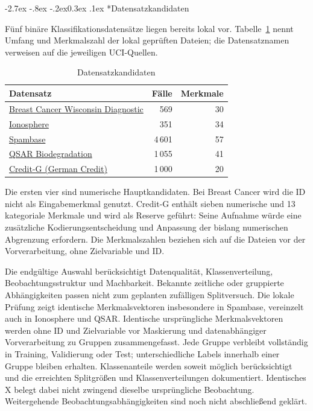 \documentclass[12pt,a4paper]{article}
\makeatletter
\renewcommand\subsection{\@startsection{subsection}{2}{\z@}%
  {-2.7ex \@plus -.8ex \@minus -.2ex}{0.3ex \@plus .1ex}%
  {\normalfont\large\bfseries}}
\makeatother
\begin{document}
\subsection*{Datensatzkandidaten}

Fünf binäre Klassifikationsdatensätze liegen bereits lokal vor.
Tabelle~\ref{tab:datensaetze} nennt Umfang und Merkmalszahl der lokal
geprüften Dateien; die Datensatznamen verweisen auf die jeweiligen
UCI-Quellen.

\begin{table}[htb]
\centering
\small
\caption{Datensatzkandidaten}
\label{tab:datensaetze}
\begin{tabular}{p{6.5cm}rr}
\toprule
\textbf{Datensatz} & \textbf{Fälle} & \textbf{Merkmale}\\
\midrule
\href{https://archive.ics.uci.edu/dataset/17/breast+cancer+wisconsin+diagnostic}{Breast Cancer Wisconsin Diagnostic}
  & 569 & 30\\
\href{https://archive.ics.uci.edu/dataset/52/ionosphere}{Ionosphere}
  & 351 & 34\\
\href{https://archive.ics.uci.edu/dataset/94/spambase}{Spambase}
  & 4\,601 & 57\\
\href{https://archive.ics.uci.edu/dataset/254/qsar+biodegradation}{QSAR Biodegradation}
  & 1\,055 & 41\\
\href{https://archive.ics.uci.edu/dataset/144/statlog+german+credit+data}{Credit-G (German Credit)}
  & 1\,000 & 20\\
\bottomrule
\end{tabular}
\end{table}

Die ersten vier sind numerische Hauptkandidaten. Bei Breast Cancer
wird die ID nicht als Eingabemerkmal genutzt. Credit-G enthält sieben
numerische und 13 kategoriale Merkmale und wird als Reserve geführt:
Seine Aufnahme würde eine zusätzliche Kodierungsentscheidung und
Anpassung der bislang numerischen Abgrenzung erfordern.
Die Merkmalszahlen beziehen sich auf die Dateien vor der Vorverarbeitung,
ohne Zielvariable und ID.

Die endgültige Auswahl berücksichtigt Datenqualität, Klassenverteilung,
Beobachtungsstruktur und Machbarkeit.
Bekannte zeitliche oder gruppierte Abhängigkeiten passen nicht zum
geplanten zufälligen Splitversuch. Die lokale Prüfung zeigt identische
Merkmalsvektoren insbesondere in Spambase, vereinzelt auch in Ionosphere
und QSAR. Identische ursprüngliche Merkmalsvektoren werden ohne ID
und Zielvariable vor Maskierung und datenabhängiger Vorverarbeitung
zu Gruppen zusammengefasst. Jede Gruppe verbleibt vollständig in
Training, Validierung oder Test; unterschiedliche Labels innerhalb
einer Gruppe bleiben erhalten. Klassenanteile werden soweit möglich
berücksichtigt und die erreichten Splitgrößen und Klassenverteilungen
dokumentiert. Identisches X belegt dabei nicht zwingend dieselbe
ursprüngliche Beobachtung.
Weitergehende Beobachtungsabhängigkeiten sind noch nicht abschließend
geklärt.
\end{document}
